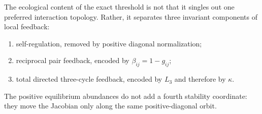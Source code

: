 The ecological content of the exact threshold is not that it singles out one preferred interaction topology. Rather, it separates three invariant components of local feedback:
\begin{enumerate}
\item self-regulation, removed by positive diagonal normalization;
\item reciprocal pair feedback, encoded by \(\beta_{ij}=1-g_{ij}\);
\item total directed three-cycle feedback, encoded by \(L_3\) and therefore by \(\kappa\).
\end{enumerate}
The positive equilibrium abundances do not add a fourth stability coordinate: they move the Jacobian only along the same positive-diagonal orbit.
